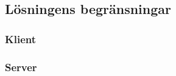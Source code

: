 \documentclass[10pt, titlepage, oneside, a4paper]{article}
\begin{document}
    	\subsection{Lösningens begränsningar}
    		\subsubsection{Klient}
    		\subsubsection{Server}
\end{document}
